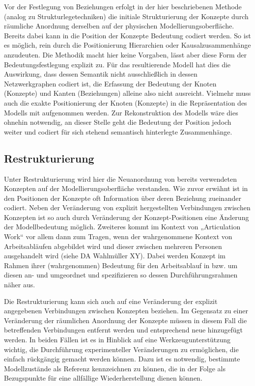 Vor der Festlegung von Beziehungen erfolgt in der hier beschriebenen Methode (analog zu Strukturlegetechniken) die initiale Strukturierung der Konzepte durch räumliche Anordnung derselben auf der physischen Modellierungsoberfläche. Bereits dabei kann in die Position der Konzepte Bedeutung codiert werden. So ist es möglich, rein durch die Positionierung Hierarchien oder Kausalzusammenhänge anzudeuten. Die Methodik macht hier keine Vorgaben, lässt aber diese Form der Bedeutungsfestlegung explizit zu. Für das resultierende Modell hat dies die Auswirkung, dass dessen Semantik nicht ausschließlich in dessen Netzwerkgraphen codiert ist, die Erfassung der Bedeutung der Knoten (Konzepte) und Kanten (Beziehungen) alleine also nicht ausreicht. Vielmehr muss auch die exakte Positionierung der Knoten (Konzepte) in die Repräsentation des Modells mit aufgenommen werden. Zur Rekonstruktion des Modells wäre dies ohnehin notwendig, an dieser Stelle geht die Bedeutung der Position jedoch weiter und codiert für sich stehend semantisch hinterlegte Zusammenhänge. 

\subsection{Restrukturierung}

Unter Restrukturierung wird hier die Neuanordnung von bereits verwendeten Konzepten auf der Modellierungsoberfläche verstanden. Wie zuvor erwähnt ist in den Positionen der Konzepte oft Information über deren Beziehung zueinander codiert. Neben der Veränderung von explizit hergestellten Verbindungen zwischen Konzepten ist so auch durch Veränderung der Konzept-Positionen eine Änderung der Modellbedeutung möglich. Zweiteres kommt im Kontext von „Articulation Work“ vor allem dann zum Tragen, wenn der wahrgenommene Kontext von Arbeitsabläufen abgebildet wird und dieser zwischen mehreren Personen ausgehandelt wird (siehe DA Wahlmüller XY). Dabei werden Konzept im Rahmen ihrer (wahrgenommen) Bedeutung für den Arbeitsablauf in bzw. um diesen an- und umgeordnet und spezifizieren so dessen Durchführungsrahmen näher aus. 

Die Restrukturierung kann sich auch auf eine Veränderung der explizit angegebenen Verbindungen zwischen Konzepten beziehen. Im Gegensatz zu einer Veränderung der räumlichen Anordnung der Konzepte müssen in diesem Fall die betreffenden Verbindungen entfernt werden und entsprechend neue hinzugefügt werden. In beiden Fällen ist es in Hinblick auf eine Werkzeugunterstützung wichtig, die Durchführung experimenteller Veränderungen zu ermöglichen, die einfach rückgängig gemacht werden können. Dazu ist es notwendig, bestimmte Modellzustände als Referenz kennzeichnen zu können, die in der Folge als Bezugspunkte für eine allfällige Wiederherstellung dienen können.

